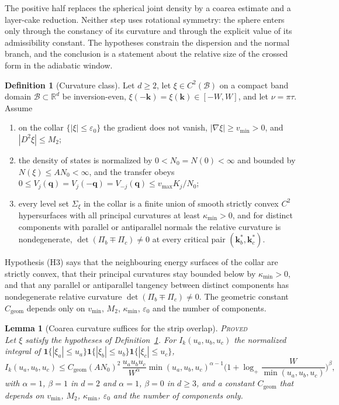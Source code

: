 \documentclass[11pt]{article}
\newcommand{\PROVED}{\upshape\mdseries\textsc{Proved}}
\newcommand{\Cgeom}{C_{\mathrm{geom}}}
\newcommand{\vmax}{v_{\max}}
\newtheorem{lemma}[theorem]{Lemma}
\theoremstyle{definition}
\newtheorem{definition}[theorem]{Definition}
\theoremstyle{remark}
\begin{document}
The positive half replaces the spherical joint density by a coarea estimate and a layer-cake reduction. Neither step uses rotational symmetry: the sphere enters only through the constancy of its curvature and through the explicit value of its admissibility constant. The hypotheses constrain the dispersion and the normal branch, and the conclusion is a statement about the relative size of the crossed form in the adiabatic window.

\begin{definition}[Curvature class]\label{def:curved}
Let $d\ge2$, let $\xi\in C^2(\mathcal B)$ on a compact band domain $\mathcal B\subset\mathbb R^d$ be inversion-even, $\xi(-\mathbf k)=\xi(\mathbf k)\in[-W,W]$, and let $\nu=\pi\tau$. Assume
\begin{enumerate}
\item[(H1)] on the collar $\{|\xi|\le\varepsilon_0\}$ the gradient does not vanish, $|\nabla\xi|\ge v_{\min}>0$, and $|D^2\xi|\le M_2$;
\item[(H2)] the density of states is normalized by $0<N_0=N(0)<\infty$ and bounded by $N(\xi)\le AN_0<\infty$, and the transfer obeys $0\le V_j(\mathbf q)=V_j(-\mathbf q)=V_{-j}(\mathbf q)\le\vmax K_j/N_0$;
\item[(H3)] every level set $\Sigma_\xi$ in the collar is a finite union of smooth strictly convex $C^2$ hypersurfaces with all principal curvatures at least $\kappa_{\min}>0$, and for distinct components with parallel or antiparallel normals the relative curvature is nondegenerate, $\det(\Pi_b\mp\Pi_c)\ne0$ at every critical pair $(\mathbf k_b^*,\mathbf k_c^*)$.
\end{enumerate}
\end{definition}

Hypothesis (H3) says that the neighbouring energy surfaces of the collar are strictly convex, that their principal curvatures stay bounded below by $\kappa_{\min}>0$, and that any parallel or antiparallel tangency between distinct components has nondegenerate relative curvature $\det(\Pi_b\mp\Pi_c)\ne0$. The geometric constant $\Cgeom$ depends only on $v_{\min}$, $M_2$, $\kappa_{\min}$, $\varepsilon_0$ and the number of components.

\begin{lemma}[Coarea curvature suffices for the strip overlap]\label{lem:coarea}\hfill\PROVED\\
Let $\xi$ satisfy the hypotheses of Definition~\ref{def:curved}. For $I_k(u_a,u_b,u_c)$ the normalized integral of $\mathbf 1\{|\xi_a|\le u_a\}\mathbf 1\{|\xi_b|\le u_b\}\mathbf 1\{|\xi_c|\le u_c\}$,
\begin{equation}\label{eq:coarea}
I_k(u_a,u_b,u_c)\le \Cgeom (AN_0)^2\,\frac{u_au_bu_c}{W^{\alpha}}\min(u_a,u_b,u_c)^{\alpha-1}\Big(1+\log_+\frac{W}{\min(u_a,u_b,u_c)}\Big)^{\beta},
\end{equation}
with $\alpha=1$, $\beta=1$ in $d=2$ and $\alpha=1$, $\beta=0$ in $d\ge3$, and a constant $\Cgeom$ that depends on $v_{\min}$, $M_2$, $\kappa_{\min}$, $\varepsilon_0$ and the number of components only.
\end{lemma}
\end{document}
